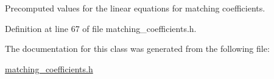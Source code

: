 Precomputed values for the linear equations for matching coefficients. 



Definition at line 67 of file matching\+\_\+coefficients.\+h.



The documentation for this class was generated from the following file\+:\begin{DoxyCompactItemize}
\item 
\hyperlink{matching__coefficients_8h}{matching\+\_\+coefficients.\+h}\end{DoxyCompactItemize}
